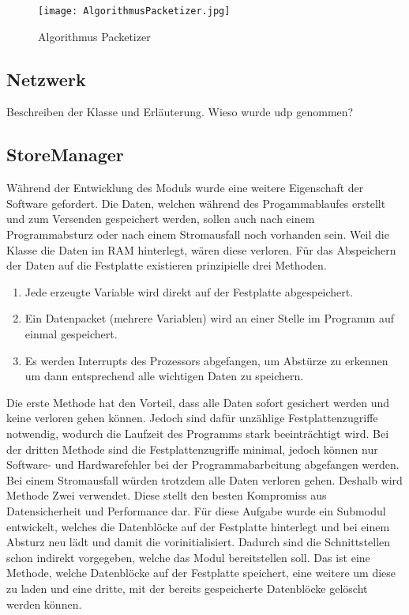 \begin{figure}[H]
\centering
\texttt{[image: AlgorithmusPacketizer.jpg]}
\caption{Algorithmus Packetizer}
\label{fig:AlgorithmusPacketizer}
\end{figure}

\subsection{Netzwerk}

Beschreiben der Klasse  und Erläuterung. Wieso wurde udp
genommen?

\subsection{StoreManager}

Während der Entwicklung des Moduls  wurde eine weitere Eigenschaft
der Software gefordert.
Die Daten, welchen während des Progammablaufes erstellt und zum Versenden
gespeichert werden, sollen auch nach einem Programmabsturz oder nach einem
Stromausfall noch vorhanden sein. Weil die Klasse 
die Daten im RAM hinterlegt, wären diese verloren.
Für das Abspeichern der Daten auf die Festplatte existieren prinzipielle drei Methoden.

\begin{enumerate}
\item Jede erzeugte Variable wird direkt auf der Festplatte abgespeichert.
\item Ein Datenpacket (mehrere Variablen) wird an einer Stelle im Programm auf
einmal gespeichert.
\item Es werden Interrupts des Prozessors abgefangen, um Abstürze zu erkennen
um dann entsprechend alle wichtigen Daten zu speichern.
\end{enumerate}

Die erste Methode hat den Vorteil, dass alle Daten sofort gesichert werden und
keine verloren gehen können. Jedoch sind dafür unzählige Festplattenzugriffe
notwendig, wodurch die Laufzeit des Programms stark beeinträchtigt wird. Bei der
dritten Methode sind die Festplattenzugriffe minimal, jedoch können nur
Software- und Hardwarefehler bei der Programmabarbeitung abgefangen werden. Bei
einem Stromausfall würden trotzdem alle Daten verloren gehen. Deshalb wird
Methode Zwei verwendet. Diese stellt den besten Kompromiss aus Datensicherheit
und Performance dar. \newline
Für diese Aufgabe wurde ein Submodul entwickelt, welches die Datenblöcke auf
der Festplatte hinterlegt und bei einem Absturz neu lädt und damit die
 vorinitialisiert. Dadurch sind die Schnittstellen schon indirekt
vorgegeben, welche das Modul bereitstellen soll. Das ist eine Methode,
welche Datenblöcke auf der Festplatte speichert, eine weitere um diese zu laden
und eine dritte, mit der bereits gespeicherte Datenblöcke gelöscht werden können. 

